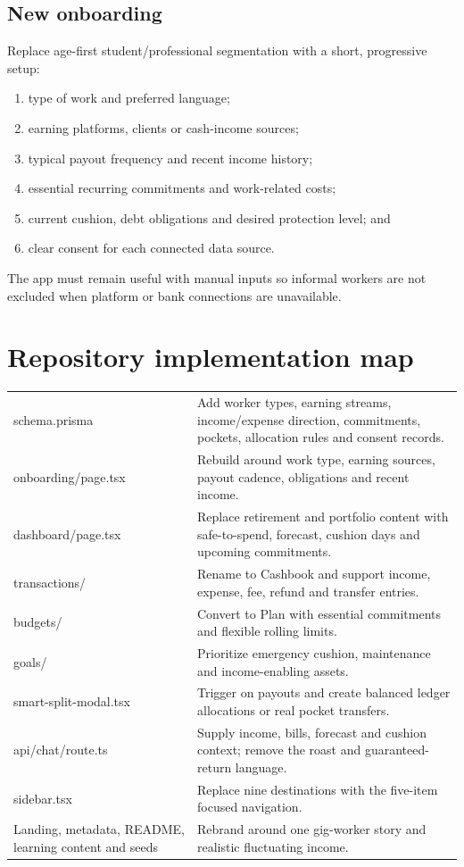 \documentclass[10pt,a4paper]{article}
\begin{document}
\subsection{New onboarding}

Replace age-first student/professional segmentation with a short, progressive setup:

\begin{enumerate}
  \item type of work and preferred language;
  \item earning platforms, clients or cash-income sources;
  \item typical payout frequency and recent income history;
  \item essential recurring commitments and work-related costs;
  \item current cushion, debt obligations and desired protection level; and
  \item clear consent for each connected data source.
\end{enumerate}

The app must remain useful with manual inputs so informal workers are not excluded when platform or bank connections are unavailable.

\newpage
\section{Repository implementation map}

\begin{tabularx}{\textwidth}{>{\ttfamily\small}p{43mm} X}
schema.prisma & Add worker types, earning streams, income/expense direction, commitments, pockets, allocation rules and consent records. \\
onboarding/page.tsx & Rebuild around work type, earning sources, payout cadence, obligations and recent income. \\
dashboard/page.tsx & Replace retirement and portfolio content with safe-to-spend, forecast, cushion days and upcoming commitments. \\
transactions/ & Rename to Cashbook and support income, expense, fee, refund and transfer entries. \\
budgets/ & Convert to Plan with essential commitments and flexible rolling limits. \\
goals/ & Prioritize emergency cushion, maintenance and income-enabling assets. \\
smart-split-modal.tsx & Trigger on payouts and create balanced ledger allocations or real pocket transfers. \\
api/chat/route.ts & Supply income, bills, forecast and cushion context; remove the roast and guaranteed-return language. \\
sidebar.tsx & Replace nine destinations with the five-item focused navigation. \\
Landing, metadata, README, learning content and seeds & Rebrand around one gig-worker story and realistic fluctuating income. \\
\end{tabularx}
\end{document}
